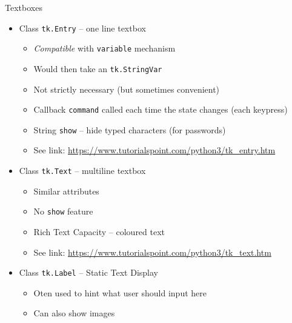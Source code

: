 \begin{frame}[fragile]{Textboxes}
%
%
\begin{itemize}
\item Class \texttt{tk.Entry} -- one line textbox
	\begin{itemize}
	\item \emph{Compatible} with \texttt{variable} mechanism
	\item Would then take an \texttt{tk.StringVar}
	\item Not strictly necessary (but sometimes convenient)
	\item Callback \texttt{command} called each time the state changes (each keypress)
	\item String \texttt{show} -- hide typed characters (for passwords)
	\item See link: {\scriptsize \url{https://www.tutorialspoint.com/python3/tk_entry.htm}}
	\end{itemize}
\item Class \texttt{tk.Text} -- multiline textbox
	\begin{itemize}
	\item Similar attributes
	\item No \texttt{show} feature
	\item Rich Text Capacity -- \zB coloured text
	\item See link: {\scriptsize \url{https://www.tutorialspoint.com/python3/tk_text.htm}}
	\end{itemize}
\item Class \texttt{tk.Label} -- Static Text Display
	\begin{itemize}
	\item Oten used to hint what user should input here
	\item Can also show images
	\end{itemize}
\end{itemize}
%
\end{frame}


